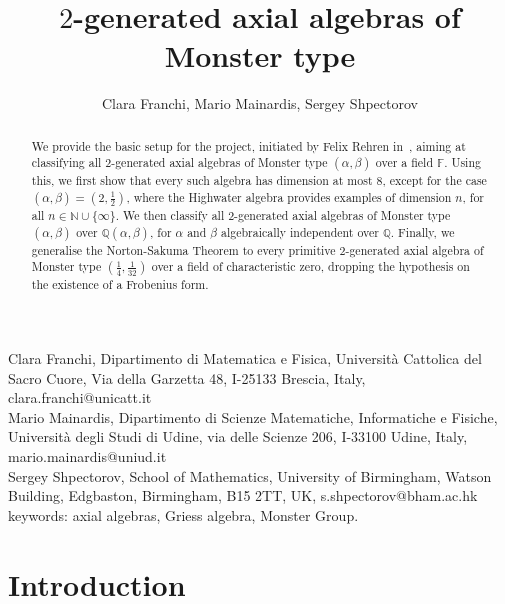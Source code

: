 \documentclass[a4paper]{amsart}
\title[]{$2$-generated axial algebras of Monster type}
\author{Clara Franchi, Mario Mainardis, Sergey Shpectorov}
\newcommand{\N}{{\mathbb N}}
\newcommand{\Q}{{\mathbb Q}}
\newcommand{\F}{{\mathbb F}}
\newcommand{\al}{\alpha}
\newcommand{\bt}{\beta}
\begin{document}
\maketitle
Clara Franchi, Dipartimento di Matematica e Fisica,
Universit\`a Cattolica del Sacro Cuore,
Via della Garzetta 48,
I-25133 Brescia, Italy,
clara.franchi@unicatt.it\\

Mario Mainardis, 
Dipartimento di Scienze Matematiche, Informatiche e Fisiche, 
Universit\`a degli Studi di Udine, via delle Scienze 206,
I-33100 Udine, Italy,\\
 mario.mainardis@uniud.it\\

Sergey Shpectorov, School of Mathematics,
University of Birmingham, 
Watson Building, Edgbaston,
Birmingham, B15 2TT, UK, s.shpectorov@bham.ac.hk\\

keywords: axial algebras, Griess algebra, Monster Group.

\begin{abstract}
We provide the basic setup for the project, initiated by Felix Rehren 
in~\cite{R}, aiming at classifying all $2$-generated axial algebras of 
Monster type $(\al,\bt)$ over a field $\F$.  Using this, we first show that every such algebra has dimension at most $8$, except for the case $(\al,\bt)=(2,\tfrac{1}{2})$, where the Highwater algebra provides examples of dimension $n$, for all $n\in \N\cup \{\infty\}$. 
We then classify all 2-generated axial 
algebras of Monster type $(\al,\bt)$ over $\Q(\al,\bt)$, for $\al$ and 
$\bt$ algebraically independent over $\Q$. Finally, we generalise the Norton-Sakuma Theorem to every primitive $2$-generated axial algebra of Monster type $(\frac{1}{4},\frac{1}{32})$ over a field of characteristic zero, dropping the hypothesis on the existence of a Frobenius form.  
\end{abstract}

\maketitle


\section{Introduction}
\end{document}
